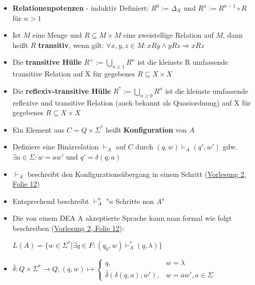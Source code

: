 \documentclass[12pt, a4paper]{article}
\begin{document}
\begin{itemize}
		\item \textbf{Relationenpotenzen} - induktiv Definiert: $R^{0}:=\Delta_{X}$ und $R^{n}:=R^{n-1}\circ R$ für $n>1$
		
		\item Ist $M$ eine Menge und $R\subseteq M\times M$ eine zweistellige Relation auf $M$, dann heißt $R$ \textbf{transitiv}, wenn gilt: $\forall x,y,z\in M:xRy \wedge yRz\Rightarrow xRz$
		
		\item Die \textbf{transitive Hülle} $R^{+}:=\bigcup_{n\geq1}R^{n}$ ist die kleinste R umfassende transitive Relation auf X für gegebenes $R\subseteq X\times X$
		
		\item Die \textbf{reflexiv-transitive Hülle} $R^{*}:=\bigcup_{n\geq0}R^{n}$ ist die kleinste umfassende reflexive und transitive Relation (auch bekannt als Quasiordnung) auf X für gegebenes $R\subseteq X\times X$
		
		\item Ein Element aus $C=Q\times\Sigma^{*}$ heißt \textbf{Konfiguration} von $A$
		
		\item Definiere eine Binärrelation $\vdash_{A}$ auf $C$ durch $(q,w)\vdash_{A}(q',w')$ gdw. $\exists a\in\Sigma:w=aw'$ und $q'=\delta(q,a)$
		
		\item \textbf{$\vdash_{A}$} beschreibt den Konfigurationsübergang in einem Schritt (\href{https://studip.uni-trier.de/sendfile.php?type=0&file_id=83576c7d025a4dd2a914bf0f42ef01c6&file_name=VL2.pdf}{Vorlesung 2, Folie 12})
		
		\item Entsprechend beschreibt $\vdash_{A}^{n}$ "$n$ Schritte non $A$"
		
		\item Die von einem DEA A akzeptierte Sprache kann man formal wie folgt beschreiben (\href{https://studip.uni-trier.de/sendfile.php?type=0&file_id=83576c7d025a4dd2a914bf0f42ef01c6&file_name=VL2.pdf}{Vorlesung 2, Folie 12}):
		\begin{center}
			$L(A)=\{w\in\Sigma^{*}|\exists q\in F:(q_{0},w)\vdash^{*}_{A}(q,\lambda)\}$
		\end{center}
		
		\item $\widehat{\delta}:Q\times\Sigma^{*}\rightarrow Q, (q,w)\mapsto
		\begin{cases}
		q, & w=\lambda \\
		\widehat{\delta}(\delta(q,a),w'), & w=aw', a\in\Sigma 
		\end{cases}$
		

\end{itemize}
\end{document}
